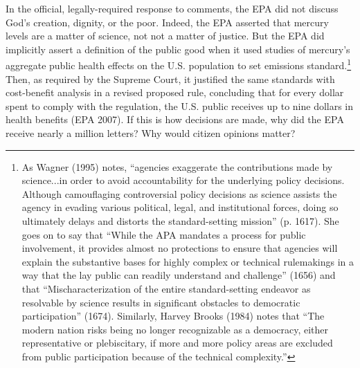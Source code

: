 In the official, legally-required response to comments, the EPA did not discuss God's creation, dignity, or the poor.  Indeed, the EPA asserted that mercury levels are a matter of science, not not a matter of justice. But the EPA did implicitly assert a definition of the public good when it used studies of mercury's aggregate public health effects on the U.S. population to set emissions standard.\footnote{As Wagner (1995) %
notes, ``agencies exaggerate the contributions made by science...in order to avoid accountability for the underlying policy decisions. Although camouflaging controversial policy decisions as science assists the agency in evading various political, legal, and institutional forces, doing so ultimately delays and distorts the standard-setting mission'' (p. 1617). She goes on to say that  ``While the APA mandates a process for public involvement, it provides almost no protections to ensure that agencies will explain the substantive bases for highly complex or technical rulemakings in a way that the lay public can readily understand and challenge'' (1656) and that ``Mischaracterization of the entire standard-setting endeavor as resolvable by science results in significant obstacles to democratic participation'' (1674). Similarly, Harvey Brooks (1984) notes that ``The modern nation risks being no longer recognizable as a democracy, either representative or plebiscitary, if more and more policy areas are excluded from public participation because of the technical complexity.''} 
Then, as required by the Supreme Court, it justified the same standards with cost-benefit analysis in a revised proposed rule, concluding that for every dollar spent to comply with the regulation, the U.S. public receives up to nine dollars in health benefits (EPA 2007). If this is how decisions are made, why did the EPA receive nearly a million letters? Why would citizen opinions matter? 


